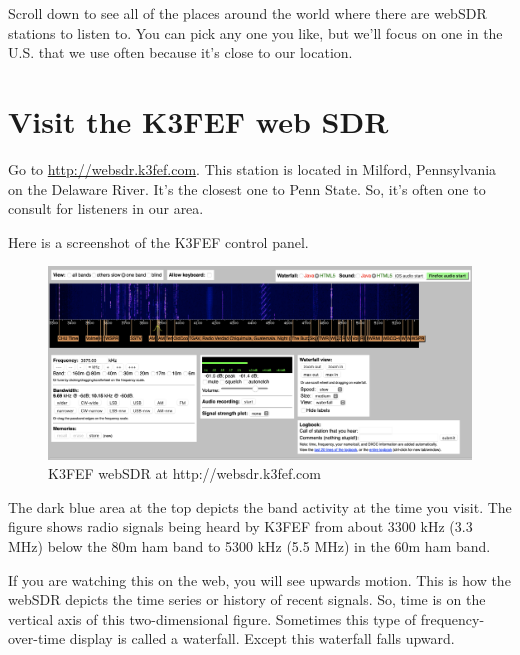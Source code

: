 \documentclass[
  letterpaper,
  DIV=11,
  numbers=noendperiod]{scrreport}
\begin{document}
Scroll down to see all of the places around the world where there are
webSDR stations to listen to. You can pick any one you like, but we'll
focus on one in the U.S. that we use often because it's close to our
location.

\hypertarget{visit-the-k3fef-web-sdr}{%
\section*{Visit the K3FEF web SDR}\label{visit-the-k3fef-web-sdr}}


Go to \url{http://websdr.k3fef.com}. This station is located in Milford,
Pennsylvania on the Delaware River. It's the closest one to Penn State.
So, it's often one to consult for listeners in our area.

Here is a screenshot of the K3FEF control panel.

\begin{figure}

{\centering \includegraphics{include/img/k3fef-websdr.png}

}

\caption{K3FEF webSDR at http://websdr.k3fef.com}

\end{figure}

The dark blue area at the top depicts the band activity at the time you
visit. The figure shows radio signals being heard by K3FEF from about
3300 kHz (3.3 MHz) below the 80m ham band to 5300 kHz (5.5 MHz) in the
60m ham band.

If you are watching this on the web, you will see upwards motion. This
is how the webSDR depicts the time series or history of recent signals.
So, time is on the vertical axis of this two-dimensional figure.
Sometimes this type of frequency-over-time display is called a
waterfall. Except this waterfall falls upward.
\end{document}
